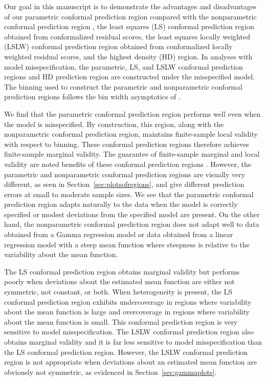 \documentclass[11pt]{article}\usepackage[]{graphicx}\usepackage[]{color}
\begin{document}
Our goal in this manuscript is to demonstrate the advantages and disadvantages 
of our parametric conformal prediction region \citep{eck2019conformal} 
compared with the nonparametric conformal prediction region 
\citep{lei2014distribution}, the least squares (LS) conformal prediction 
region \citep{lei2018distribution} obtained from conformalized residual scores, 
the least squares locally weighted (LSLW) conformal prediction region 
\citep[Section 5.2]{lei2018distribution} obtained from conformalized locally 
weighted residual scores, and the highest density (HD) region. In analyses 
with model misspecification, the parametric, LS, and LSLW conformal prediction 
regions and HD prediction region are constructed under the misspecified 
model.  The binning used to construct the parametric and 
nonparametric conformal prediction regions follows the bin width asymptotics 
of \citet{lei2014distribution}.

We find that the parametric conformal prediction 
region performs well even when the model is misspecified.  By construction, 
this region, along with the nonparametric conformal prediction region, 
maintains finite-sample local validity with respect to binning.  
These conformal prediction regions therefore achieves finite-sample marginal 
validity.  The guarantee of finite-sample marginal and local validity are 
noted benefits of these conformal prediction regions 
\citep{lei2014distribution, eck2019conformal}.  
However, the parametric and nonparametric conformal prediction regions are 
visually very different, as seen in Section~\ref{sec:plotsofregions}, and 
give different prediction errors at small to moderate sample sizes.  
We see that the parametric conformal prediction region adapts naturally 
to the data when the model is correctly specified or modest deviations 
from the specified model are present.  On the other hand, the 
nonparametric conformal prediction region does not adapt well to 
data obtained from a Gamma regression model or data obtained from a 
linear regression model with a steep mean function where steepness is 
relative to the variability about the mean function.

The LS conformal prediction region obtains marginal validity 
\citep{lei2018distribution} but performs poorly when deviations about the 
estimated mean function are either not symmetric, not constant, or both.
When heterogeneity is present, the LS conformal prediction region exhibits 
undercoverage in regions where variability about the mean function is large 
and overcoverage in regions where variability about the mean function is 
small.  This conformal prediction region is very sensitive to model 
misspecification.  
The LSLW conformal prediction region also obtains marginal validity 
\citep[Section 5.2]{lei2018distribution} and it is far less sensitive to 
model misspecification than the LS conformal prediction region.  
However, the LSLW conformal prediction region is not appropriate 
when deviations about an estimated mean function are obviously not 
symmetric, as evidenced in Section~\ref{sec:gammaplots}.
\end{document}
